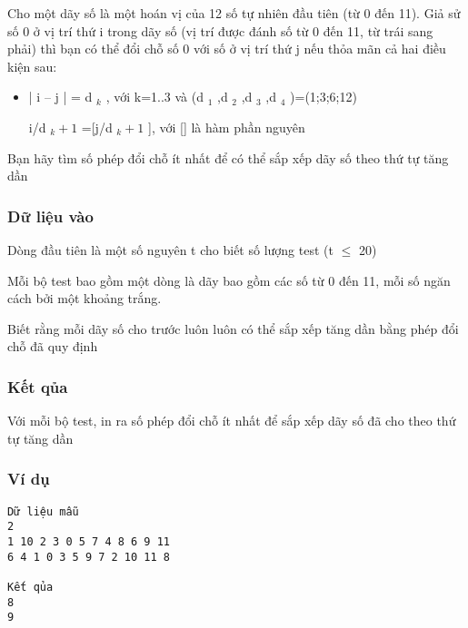 



   Cho một dãy số là một hoán vị của 12 số tự nhiên đầu tiên (từ 0 đến 11). Giả sử số 0 ở vị trí thứ i trong dãy số (vị trí được đánh số từ 0 đến 11, từ trái sang phải) thì bạn có thể đổi chỗ số 0 với số ở vị trí thứ j nếu thỏa mãn cả hai điều kiện sau:  
\begin{itemize}
	\item     | i – j | = d    $_     k    $    , với k=1..3 và (d    $_     1    $    ,d    $_     2    $    ,d    $_     3    $    ,d    $_     4    $    )=(1;3;6;12)    


	\item     [i/d    $_     k+1    $    ]=[j/d    $_     k+1    $    ], với [] là hàm phần nguyên   
\end{itemize}

   Bạn hãy tìm số phép đổi chỗ ít nhất để có thể sắp xếp dãy số theo thứ tự tăng dần  

\subsubsection{   Dữ liệu vào  }

   Dòng đầu tiên là một số nguyên t cho biết số lượng test (t $\le$ 20)  

   Mỗi bộ test bao gồm một dòng là dãy bao gồm các số từ 0 đến 11, mỗi số ngăn cách bởi một khoảng trắng.  

   Biết rằng mỗi dãy số cho trước luôn luôn có thể sắp xếp tăng dần bằng phép đổi chỗ đã quy định  

\subsubsection{   Kết qủa  }

   Với mỗi bộ test, in ra số phép đổi chỗ ít nhất để sắp xếp dãy số đã cho theo thứ tự tăng dần  

\subsubsection{   Ví dụ  }
\begin{verbatim}
Dữ liệu mẫu
2
1 10 2 3 0 5 7 4 8 6 9 11
6 4 1 0 3 5 9 7 2 10 11 8

Kết qủa
8
9
\end{verbatim}
